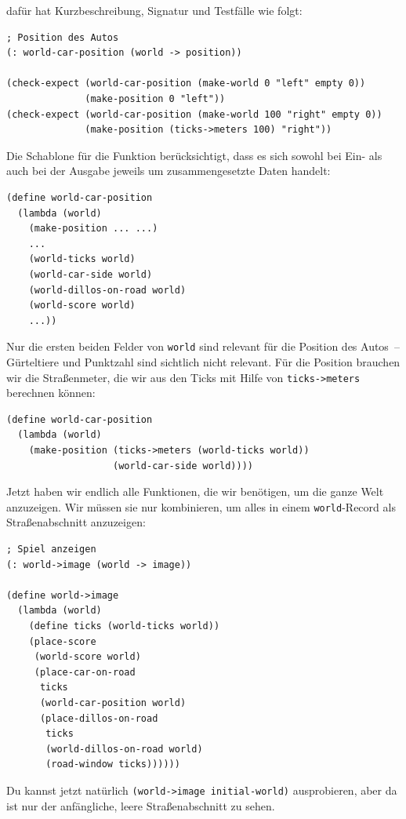 dafür hat Kurzbeschreibung, Signatur und Testfälle wie folgt:
%
\begin{lstlisting}
; Position des Autos
(: world-car-position (world -> position))

(check-expect (world-car-position (make-world 0 "left" empty 0))
              (make-position 0 "left"))
(check-expect (world-car-position (make-world 100 "right" empty 0))
              (make-position (ticks->meters 100) "right"))
\end{lstlisting}
%
Die Schablone für die Funktion berücksichtigt, dass es sich sowohl bei
Ein- als auch bei der Ausgabe jeweils um zusammengesetzte Daten handelt:
%
\begin{lstlisting}
(define world-car-position
  (lambda (world)
    (make-position ... ...)
    ...
    (world-ticks world)
    (world-car-side world)
    (world-dillos-on-road world)
    (world-score world)
    ...))
\end{lstlisting}
%
Nur die ersten beiden Felder von \lstinline{world} sind relevant für
die Position des Autos~-- Gürteltiere und Punktzahl sind sichtlich
nicht relevant.  Für die Position brauchen wir die Straßenmeter, die
wir aus den Ticks mit Hilfe von \lstinline{ticks->meters} berechnen
können:
%
\begin{lstlisting}
(define world-car-position
  (lambda (world)
    (make-position (ticks->meters (world-ticks world))
                   (world-car-side world))))
\end{lstlisting}
%
Jetzt haben wir endlich alle Funktionen, die wir benötigen, um die
ganze Welt anzuzeigen.  Wir müssen sie nur kombinieren, um alles in
einem \lstinline{world}-Record als Straßenabschnitt anzuzeigen:
%
\begin{lstlisting}
; Spiel anzeigen
(: world->image (world -> image))

(define world->image
  (lambda (world)
    (define ticks (world-ticks world))
    (place-score
     (world-score world)
     (place-car-on-road
      ticks
      (world-car-position world)
      (place-dillos-on-road
       ticks
       (world-dillos-on-road world)
       (road-window ticks))))))
\end{lstlisting}
%
Du kannst jetzt natürlich
\lstinline{(world->image initial-world)}
ausprobieren, aber da ist nur der anfängliche, leere Straßenabschnitt
zu sehen.

